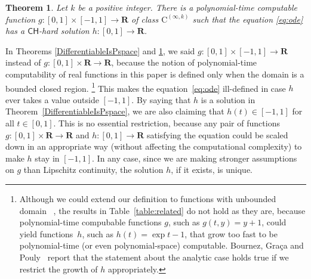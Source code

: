 \documentclass[12pt,a4paper]{article}
\newtheorem{theorem}{Theorem}%
\theoremstyle{definition}
\theoremstyle{remark}
\newcommand{\R}{\mathbf R}
\newcommand{\classCH}{\mathsf{CH}}
\newcommand{\classC}{\mathrm C}
\begin{document}
 \begin{theorem}
  \label{KTimesIsCH}
Let $k$ be a positive integer. 
There is a polynomial-time computable function
$g \colon [0,1] \times [-1,1] \to \R$ 
of class $\classC ^{(\infty, k)}$ such that
the equation \eqref{eq:ode} has a 
$\classCH$-hard solution $h \colon [0, 1] \to \R$. 
 \end{theorem}

In Theorems \ref{DifferentiableIsPspace} and \ref{KTimesIsCH}, 
we said
$g \colon [0,1] \times [-1, 1] \to \R$ instead of 
$g \colon [0,1] \times \R \to \R$, because
the notion of polynomial-time computability of real functions 
in this paper is defined only when the domain is a bounded closed region.%
\footnote{%
Although we could extend our definition to 
functions with unbounded domain~%
\cite[Sect.~4.1]{kawamura2010operators}, 
the results in Table~\ref{table:related} 
do not hold as they are, 
because polynomial-time compubable functions $g$, 
such as $g (t, y) = y + 1$, 
could yield functions~$h$, such as $h (t) = \exp t - 1$, 
that grow too fast to be polynomial-time (or even polynomial-space) computable. 
Bournez, Gra\c ca and Pouly~%
\cite[Theorem~2]{bournez11:_solvin_analy_differ_equat_in}
report that the statement about the analytic case holds true 
if we restrict the growth of $h$ %
appropriately. 
} 
This makes the equation~\eqref{eq:ode} ill-defined 
in case $h$ ever takes a value outside $[-1, 1]$. 
By saying that $h$ is a solution in Theorem~\ref{DifferentiableIsPspace}, 
we are also claiming that 
$h (t) \in [-1, 1]$ for all $t \in [0, 1]$. 
This is no essential restriction, 
because any pair of functions 
$g \colon [0,1] \times \R \to \R$ and $h \colon [0, 1] \to \R$
satisfying the equation
could be scaled down in an appropriate way 
(without affecting the computational complexity)
to make $h$ stay in $[-1, 1]$. 
In any case, 
since we are making stronger assumptions on $g$ than Lipschitz continuity, 
the solution $h$, if it exists, is unique. 
\end{document}
